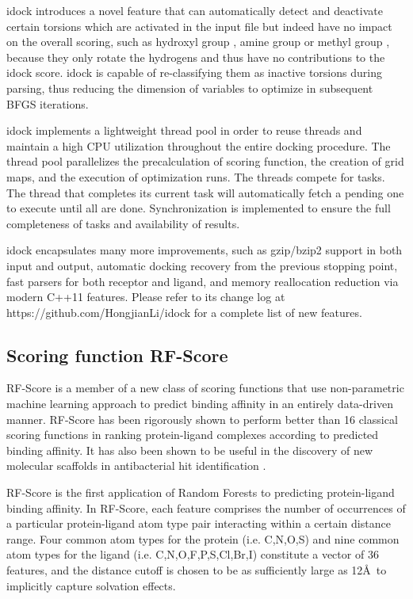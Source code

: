 \documentclass[10pt]{article}
\begin{document}
idock introduces a novel feature that can automatically detect and deactivate certain torsions which are activated in the input file but indeed have no impact on the overall scoring, such as hydroxyl group , amine group  or methyl group , because they only rotate the hydrogens and thus have no contributions to the idock score. idock is capable of re-classifying them as inactive torsions during parsing, thus reducing the dimension of variables to optimize in subsequent BFGS iterations.

idock implements a lightweight thread pool in order to reuse threads and maintain a high CPU utilization throughout the entire docking procedure. The thread pool parallelizes the precalculation of scoring function, the creation of grid maps, and the execution of optimization runs. The threads compete for tasks. The thread that completes its current task will automatically fetch a pending one to execute until all are done. Synchronization is implemented to ensure the full completeness of tasks and availability of results.

idock encapsulates many more improvements, such as gzip/bzip2 support in both input and output, automatic docking recovery from the previous stopping point, fast parsers for both receptor and ligand, and memory reallocation reduction via modern C++11 features. Please refer to its change log at https://github.com/HongjianLi/idock for a complete list of new features.

\subsection*{Scoring function RF-Score}
RF-Score \cite{564} is a member of a new class of scoring functions that use non-parametric machine learning approach to predict binding affinity in an entirely data-driven manner. RF-Score has been rigorously shown \cite{564,908} to perform better than 16 classical scoring functions in ranking protein-ligand complexes according to predicted binding affinity. It has also been shown to be useful in the discovery of new molecular scaffolds in antibacterial hit identification \cite{1281}.

RF-Score is the first application of Random Forests \cite{1309} to predicting protein-ligand binding affinity. In RF-Score, each feature comprises the number of occurrences of a particular protein-ligand atom type pair interacting within a certain distance range. Four common atom types for the protein (i.e. C,N,O,S) and nine common atom types for the ligand (i.e. C,N,O,F,P,S,Cl,Br,I) constitute a vector of 36 features, and the distance cutoff is chosen to be as sufficiently large as 12\AA\ to implicitly capture solvation effects.
\end{document}
